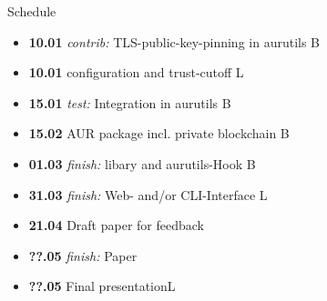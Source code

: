 \documentclass{beamer}
\begin{document}
\begin{frame}{Schedule}
	\begin{itemize}
		\item \textbf{10.01} \emph{contrib:} TLS-public-key-pinning in aurutils \hfill B
		\item \textbf{10.01} configuration and trust-cutoff \hfill L
		\item \textbf{15.01} \emph{test:} \alert{Integration in aurutils} \hfill B
		\item \textbf{15.02} \alert{AUR package} incl. private blockchain \hfill B
		\item \textbf{01.03} \emph{finish:} libary and aurutils-Hook \hfill B
		\item \textbf{31.03} \emph{finish:} Web- and/or CLI-Interface \hfill L
		\item \textbf{21.04} \alert{Draft paper} for feedback\hfill
		\item \textbf{??.05} \emph{finish:} Paper\hfill
		\item \textbf{??.05} Final presentation\hfill L
	\end{itemize}
\end{frame}
\end{document}
